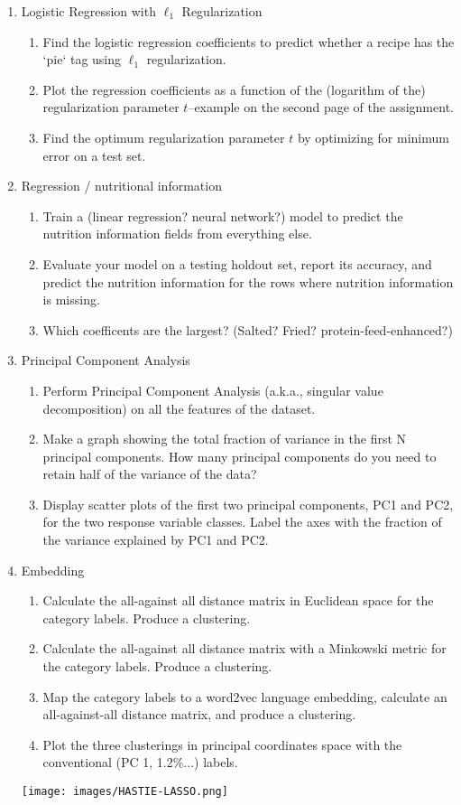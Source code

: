 \documentclass[12pt]{book}
\theoremstyle{definition}
\begin{document}
\begin{enumerate}

  \item Logistic Regression with $\ell_1$ Regularization
  \begin{enumerate}
    \item Find the logistic regression coefficients to predict whether a recipe has the `pie` tag using $\ell_1$ regularization.  
    \item Plot the regression coefficients as a function of the (logarithm of the) regularization parameter $t$--example on the second page of the assignment. 
    \item Find the optimum regularization parameter $t$ by optimizing for minimum error on a test set.
  \end{enumerate}
  
\item Regression / nutritional information
  \begin{enumerate}
    \item Train a (linear regression?  neural network?)  model to predict the nutrition information fields from everything else.  
    \item  Evaluate your model on a testing holdout set, report its accuracy, and predict the nutrition information for the rows where nutrition information is missing.
    \item  Which coefficents are the largest?  (Salted?  Fried?  protein-feed-enhanced?)
  \end{enumerate}

  \item Principal Component Analysis 
  \begin{enumerate}
    \item Perform Principal Component Analysis (a.k.a., singular value decomposition) on all the features of the dataset. 
    \item Make a graph showing the total fraction of variance in the first N principal components.   How many principal components do you need to retain half of the variance of the data?
    \item Display scatter plots of the first two principal components, PC1 and PC2, for the two response variable classes. Label the axes with the fraction of the variance explained by PC1 and PC2. 
  \end{enumerate}

  \item Embedding 
  \begin{enumerate}
    \item Calculate the all-against all distance matrix in Euclidean space for the category labels.  Produce a clustering.
    \item Calculate the all-against all distance matrix with a Minkowski metric for the category labels.  Produce a clustering.
    \item Map the category labels to a word2vec language embedding, calculate an all-against-all distance matrix, and produce a clustering. 
    \item Plot the three clusterings in principal coordinates space with the conventional (PC 1, 1.2\%...) labels.
  \end{enumerate}

\texttt{[image: images/HASTIE-LASSO.png]}


\end{enumerate}
\end{document}
